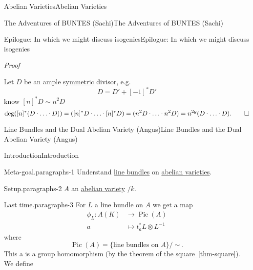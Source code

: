 \documentclass[10pt,]{book}
\makeatletter
\renewcommand*{\proofname}{Proof}
\renewenvironment{proof}[1][\proofname]{\par
  \pushQED{\qed}%
  \normalfont \topsep6\p@\@plus6\p@\relax
  \trivlist
  \item\relax
    {\itshape
    #1\@addpunct{.}}\hspace\labelsep\ignorespaces
}{%
  \popQED\endtrivlist\@endpefalse
}
\numberwithin{equation}{section}
\newcommand{\lb}{[}
\newcommand{\rb}{]}
\DeclareMathOperator{\Pic}{Pic}
\newcommand{\amp}{&}
\makeatother
\begin{document}
\begin{chapterptx}{Abelian Varieties}{}{Abelian Varieties}{}{}
\begin{sectionptx}{The Adventures of BUNTES (Sachi)}{}{The Adventures of BUNTES (Sachi)}{}{}
\begin{subsectionptx}{Epilogue: In which we might discuss isogenies}{}{Epilogue: In which we might discuss isogenies}{}{}
\begin{proof}
\hypertarget{p-162}{}%
Let \(D\) be an ample \hyperref[def-princ-pol]{symmetric} divisor, e.g.%
\begin{equation*}
D = D' + [-1]^* D'
\end{equation*}
know \(\lb n \rb^* D \sim n^2 D\)%
\begin{equation*}
\deg([n]^*(D\cdot\ldots\cdot D)) = ([n]^*D\cdot \ldots\cdot [n]^*D) = (n^2 D\cdot\ldots\cdot n^2 D)= n^{2g} (D\cdot \ldots\cdot D)\text{.}\qedhere
\end{equation*}
%
\end{proof}
\end{subsectionptx}
\end{sectionptx}
%
%
\typeout{************************************************}
\typeout{************************************************}
%
\begin{sectionptx}{Line Bundles and the Dual Abelian Variety (Angus)}{}{Line Bundles and the Dual Abelian Variety (Angus)}{}{}\label{sec-dual-ab}
%
%
\typeout{************************************************}
\typeout{************************************************}
%
\begin{subsectionptx}{Introduction}{}{Introduction}{}{}\label{subsection-19}
\begin{paragraphs}{Meta-goal.}{paragraphs-1}%
\hypertarget{p-163}{}%
Understand \hyperref[def-line-bundle]{line bundles} on \hyperref[def-buntes-abvar]{abelian varieties}.%
\end{paragraphs}%
\begin{paragraphs}{Setup.}{paragraphs-2}%
\hypertarget{p-164}{}%
\(A\) an \hyperref[def-buntes-abvar]{abelian variety} \(/k\).%
\end{paragraphs}%
\begin{paragraphs}{Last time.}{paragraphs-3}%
\hypertarget{p-165}{}%
For \(L\) a \hyperref[def-line-bundle]{line bundle} on \(A\) we get a map%
\begin{align*}
\phi_L\colon A(K) \amp\to \Pic(A)\\
a\amp\mapsto t_a^* L\otimes L^{-1}
\end{align*}
where%
\begin{equation*}
\Pic(A) = \{\text{line bundles on } A\}/\sim\text{.}
\end{equation*}
This a is a group homomorphism (by the \hyperref[thm-square]{theorem of the square~\ref{thm-square}}). We define%
\begin{equation*}

\end{equation*}
\end{paragraphs}
\end{subsectionptx}
\end{sectionptx}
\end{chapterptx}
\end{document}
